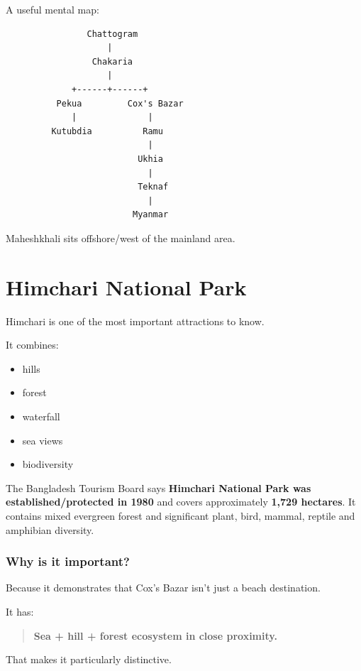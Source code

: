 A useful mental map:

\begin{lstlisting}
                Chattogram
                    |
                 Chakaria
                    |
             +------+------+
          Pekua         Cox's Bazar
             |              |
         Kutubdia          Ramu
                            |
                          Ukhia
                            |
                          Teknaf
                            |
                         Myanmar
\end{lstlisting}

Maheshkhali sits offshore/west of the mainland area.

\medskip

\section{Himchari National Park}

Himchari is one of the most important attractions to know.

It combines:

\begin{itemize}
  \item hills
  \item forest
  \item waterfall
  \item sea views
  \item biodiversity
\end{itemize}

The Bangladesh Tourism Board says \textbf{Himchari National Park was established/protected in 1980} and covers approximately \textbf{1,729 hectares}. It contains mixed evergreen forest and significant plant, bird, mammal, reptile and amphibian diversity.

\subsubsection{Why is it important?}

Because it demonstrates that Cox's Bazar isn't just a beach destination.

It has:

\begin{quote}
\textbf{Sea + hill + forest ecosystem in close proximity.}\\
\end{quote}

That makes it particularly distinctive.


